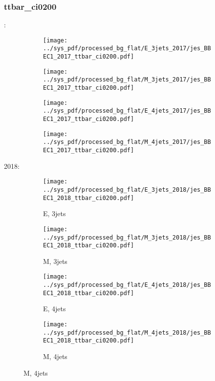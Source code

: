 \documentclass{beamer}
\begin{document}
\begin{frame}
\frametitle{ttbar_ci0200}
\fontsize{5}{1}:
\begin{figure}
\centering
\begin{subfigure}[b]{0.24\textwidth}
\texttt{[image: ../sys\_pdf/processed\_bg\_flat/E\_3jets\_2017/jes\_BBEC1\_2017\_ttbar\_ci0200.pdf]}
\end{subfigure}
\begin{subfigure}[b]{0.24\textwidth}
\texttt{[image: ../sys\_pdf/processed\_bg\_flat/M\_3jets\_2017/jes\_BBEC1\_2017\_ttbar\_ci0200.pdf]}
\end{subfigure}
\begin{subfigure}[b]{0.24\textwidth}
\texttt{[image: ../sys\_pdf/processed\_bg\_flat/E\_4jets\_2017/jes\_BBEC1\_2017\_ttbar\_ci0200.pdf]}
\end{subfigure}
\begin{subfigure}[b]{0.24\textwidth}
\texttt{[image: ../sys\_pdf/processed\_bg\_flat/M\_4jets\_2017/jes\_BBEC1\_2017\_ttbar\_ci0200.pdf]}
\end{subfigure}
\end{figure}
2018:
\begin{figure}
\centering
\begin{subfigure}[b]{0.24\textwidth}
\texttt{[image: ../sys\_pdf/processed\_bg\_flat/E\_3jets\_2018/jes\_BBEC1\_2018\_ttbar\_ci0200.pdf]}
\captionsetup{font=tiny}
\caption{E, 3jets}
\end{subfigure}
\begin{subfigure}[b]{0.24\textwidth}
\texttt{[image: ../sys\_pdf/processed\_bg\_flat/M\_3jets\_2018/jes\_BBEC1\_2018\_ttbar\_ci0200.pdf]}
\captionsetup{font=tiny}
\caption{M, 3jets}
\end{subfigure}
\begin{subfigure}[b]{0.24\textwidth}
\texttt{[image: ../sys\_pdf/processed\_bg\_flat/E\_4jets\_2018/jes\_BBEC1\_2018\_ttbar\_ci0200.pdf]}
\captionsetup{font=tiny}
\caption{E, 4jets}
\end{subfigure}
\begin{subfigure}[b]{0.24\textwidth}
\texttt{[image: ../sys\_pdf/processed\_bg\_flat/M\_4jets\_2018/jes\_BBEC1\_2018\_ttbar\_ci0200.pdf]}
\captionsetup{font=tiny}
\caption{M, 4jets}
\end{subfigure}
\end{figure}
\end{frame}
\end{document}

